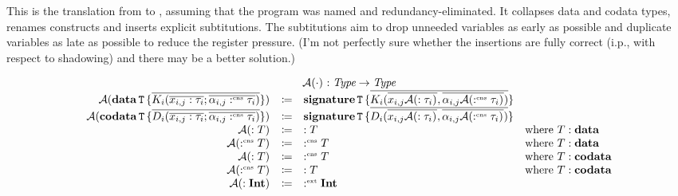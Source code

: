 This is the translation from \targetlang{} to \machinelang, assuming that the program was named and redundancy-eliminated.
It collapses data and codata types, renames constructs and inserts explicit subtitutions.
The subtitutions aim to drop unneeded variables as early as possible and duplicate variables as late as possible to reduce the register pressure.
(I'm not perfectly sure whether the insertions are fully correct (i.p., with respect to shadowing) and there may be a better solution.)

\[
  \begin{array}{rcll}
    \multicolumn{4}{c}{\axcutify{\cdot}{} : \emph{Type} \rightarrow \emph{Type}}\\
    \axcutify{\data{T}{\overline{K_i(\overline{x_{i,j} : \tau_i}; \overline{\alpha_{i,j} \cnt \tau_i})}}}{} & \coloneq & \sig{T}{\overline{K_i(\overline{x_{i,j} \axcutify{: \tau_i}{}}, \overline{\alpha_{i,j} \axcutify{\cnt \tau_i}{}})}} & \\
    \axcutify{\codata{T}{\overline{D_i(\overline{x_{i,j} : \tau_i}; \overline{\alpha_{i,j} \cnt \tau_i})}}}{} & \coloneq & \sig{T}{\overline{D_i(\overline{x_{i,j} \axcutify{: \tau_i}{}}, \overline{\alpha_{i,j} \axcutify{\cnt \tau_i}{}})}} & \\
    \axcutify{: T}{} & \coloneq & : T & \text{where } T : \mathbf{data} \\
    \axcutify{\cnt T}{} & \coloneq & \cnt T & \text{where } T : \mathbf{data} \\
    \axcutify{: T}{} & \coloneq & \cnt T & \text{where } T : \mathbf{codata} \\
    \axcutify{\cnt T}{} & \coloneq & : T & \text{where } T : \mathbf{codata} \\
    \axcutify{: \tyint}{} & \coloneq & \ext \tyint & \\
  \end{array}
\]

